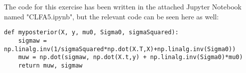 The code for this exercise has been written in the attached Jupyter Notebook named "CLFA5.ipynb", but the relevant code can be seen here as well:
\begin{verbatim}
def myposterior(X, y, mu0, Sigma0, sigmaSquared):
    sigmaw = np.linalg.inv(1/sigmaSquared*np.dot(X.T,X)+np.linalg.inv(Sigma0))
    muw = np.dot(sigmaw, np.dot(X.t,y) + np.linalg.inv(Sigma0)*mu0)
    return muw, sigmaw
\end{verbatim}